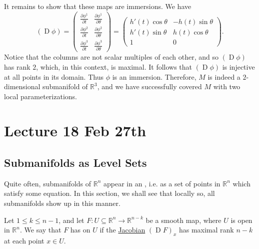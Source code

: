\documentclass[notoc,notitlepage]{tufte-book}
\DeclareMathOperator{\D}{D}
\begin{document}
It remains to show that these maps are immersions. We have
\begin{equation*}
  (\D \phi) = \begin{pmatrix}
    \frac{\partial \phi^1}{\partial t} & \frac{\partial \phi^1}{\partial \theta}
    \\
    \frac{\partial \phi^2}{\partial t} & \frac{\partial \phi^2}{\partial \theta}
    \\
    \frac{\partial \phi^3}{\partial t} & \frac{\partial \phi^3}{\partial \theta}
  \end{pmatrix} = \begin{pmatrix}
    h'(t) \cos \theta & - h(t) \sin \theta \\
    h'(t) \sin \theta & h(t) \cos \theta \\
    1                 & 0
  \end{pmatrix}.
\end{equation*}
Notice that the columns are not scalar multiples of each other, and so $(\D
\phi)$ has rank $2$, which, in this context, is maximal. It follows that $(\D
\phi)$ is injective at all points in its domain. Thus $\phi$ is an immersion.
Therefore, $M$ is indeed a $2$-dimensional submanifold of $\mathbb{R}^3$, and we
have successfully covered $M$ with two local parameterizations.



\chapter{Lecture 18 Feb 27th}%
\label{chp:lecture_18_feb_27th}

\section{Submanifolds as Level Sets}%
\label{sec:submanifolds_as_level_sets}

Quite often, submanifolds of $\mathbb{R}^n$ appear in an ,
i.e. as a set of points in $\mathbb{R}^n$ which satisfy some equation. In this
section, we shall see that locally so, all submanifolds show up in this manner.

\begin{defn}\label{defn:maximal_rank}
  Let $1 \leq k \leq n - 1$, and let $F : U \subseteq \mathbb{R}^n \to
  \mathbb{R}^{n - k}$ be a smooth map, where $U$ is open in $\mathbb{R}^n$. We
  say that $F$ has  on $U$ if the
  \hyperref[defn:differential]{Jacobian} $(\D F)_{x}$ has maximal rank $n - k$
  at each point $x \in U$.
\end{defn}
\end{document}
